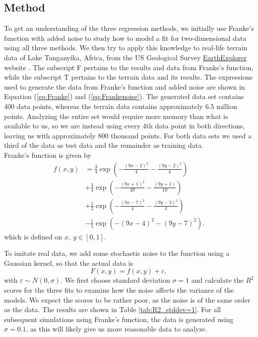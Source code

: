 \documentclass[a4paper, 10pt]{article}
\begin{document}
\begin{multicols}{2}
\section{Method}
To get an understanding of the three regression methods, we initially use Franke's function with added noise to study how to model a fit for two-dimensional data using all three methods. We then try to apply this knowledge to real-life terrain data of Lake Tanganyika, Africa, from the US Geological Survey \href{https://earthexplorer.usgs.gov/}{EarthExplorer}  website \cite{earthexplorer} .  The subscript F pertains to the results and data from Franke's function, while the subscript T pertains to the terrain data and its results.  The expressions used to generate the data from Franke's function and added noise are shown in Equation (\ref{eq:Franke}) and (\ref{eq:Frankenoise}). The generated data set contains 400 data points, whereas the terrain data contains approximately $6.5$ million points. Analyzing the entire set would require more memory than what is available to us, so we are instead using every 4th data point in both directions, leaving us with approximately 800 thousand points.  For both data sets we used a third of the data as test data and the remainder as training data.
\\
Franke's function is given by
\begin{align}
f(x,y) &= \frac{3}{4}\exp{\left(-\frac{(9x-2)^2}{4}   - \frac{(9y-2)^2}{4}\right)} \nonumber\\
 &+\frac{3}{4}\exp{\left(-\frac{(9x+1)^2}{49}- \frac{(9y+1)}{10}\right)} \nonumber\\
 &+\frac{1}{2}\exp{\left(-\frac{(9x-7)^2}{4} - \frac{(9y-3)^2}{4}\right)} \nonumber\\
 &-\frac{1}{5}\exp{\left(-(9x-4)^2 - (9y-7)^2\right) }. \label{eq:Franke}
\end{align} which is defined on $x,\ y \in [0,1]$.

To imitate real data, we add some stochastic noise to the function using a Gaussian kernel, so that the actual data is 
\begin{equation}
F(x, y) = f(x, y) + \varepsilon \label{eq:Frankenoise},
\end{equation}
with $ \varepsilon \sim N(0, \sigma) $. We first choose standard deviation $\sigma=1$ and calculate the $R^2$ scores for the three fits to examine how the noise affects the variance of the models. We expect the scores to be rather poor, as the noise is of the same order as the data.  The results are shown in Table \ref{tab:R2_stddev=1}. For all subsequent simulations using Franke's function, the data is generated using $\sigma=0.1$, as this will likely give us more reasonable data to analyze. 


\end{multicols}
\end{document}
